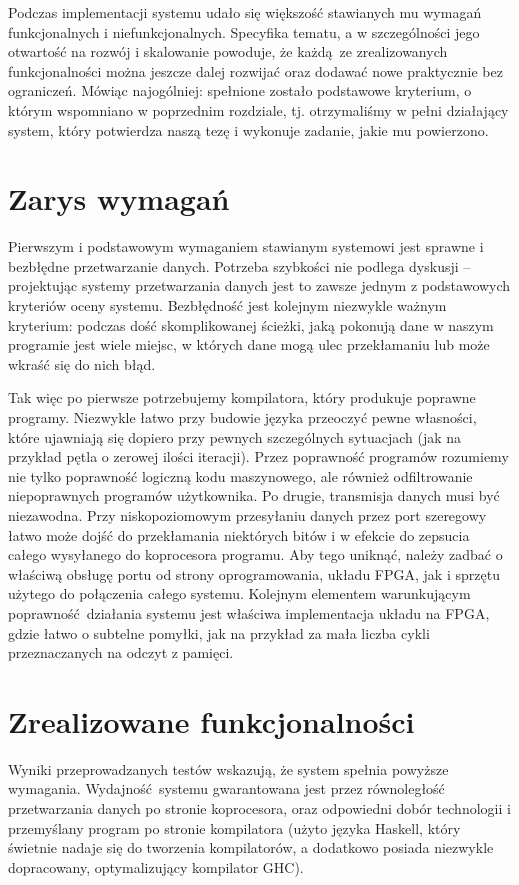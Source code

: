 Podczas implementacji systemu udało się większość stawianych mu wymagań funkcjonalnych i niefunkcjonalnych. Specyfika tematu, a w szczególności jego otwartość na rozwój i skalowanie powoduje, że każdą ze zrealizowanych funkcjonalności można jeszcze dalej rozwijać oraz dodawać nowe praktycznie bez ograniczeń. Mówiąc najogólniej: spełnione zostało podstawowe kryterium, o którym wspomniano w poprzednim rozdziale, tj. otrzymaliśmy w pełni działający system, który potwierdza naszą tezę i wykonuje zadanie, jakie mu powierzono.

\section{Zarys wymagań}
Pierwszym i podstawowym wymaganiem stawianym systemowi jest sprawne i bezbłędne przetwarzanie danych. Potrzeba szybkości nie podlega dyskusji -- projektując systemy przetwarzania danych jest to zawsze jednym z podstawowych kryteriów oceny systemu. Bezbłędność jest kolejnym niezwykle ważnym kryterium: podczas dość skomplikowanej ścieżki, jaką pokonują dane w naszym programie jest wiele miejsc, w których dane mogą ulec przekłamaniu lub może wkraść się do nich błąd.

Tak więc po pierwsze potrzebujemy kompilatora, który produkuje poprawne programy. Niezwykle łatwo przy budowie języka przeoczyć pewne własności, które ujawniają się dopiero przy pewnych szczególnych sytuacjach (jak na przykład pętla o zerowej ilości iteracji). Przez poprawność programów rozumiemy nie tylko poprawność logiczną kodu maszynowego, ale również odfiltrowanie niepoprawnych programów użytkownika. Po drugie, transmisja danych musi być niezawodna. Przy niskopoziomowym przesyłaniu danych przez port szeregowy łatwo może dojść do przekłamania niektórych bitów i w efekcie do zepsucia całego wysyłanego do koprocesora programu. Aby tego uniknąć, należy zadbać o właściwą obsługę portu od strony oprogramowania, układu FPGA, jak i sprzętu użytego do połączenia całego systemu. Kolejnym elementem warunkującym poprawność działania systemu jest właściwa implementacja układu na FPGA, gdzie łatwo o subtelne pomyłki, jak na przykład za mała liczba cykli przeznaczanych na odczyt z pamięci.

\section{Zrealizowane funkcjonalności}
Wyniki przeprowadzanych testów wskazują, że system spełnia powyższe wymagania. Wydajność systemu gwarantowana jest przez równoległość przetwarzania danych po stronie koprocesora, oraz odpowiedni dobór technologii i przemyślany program po stronie kompilatora (użyto języka Haskell, który świetnie nadaje się do tworzenia kompilatorów, a dodatkowo posiada niezwykle dopracowany, optymalizujący kompilator GHC).



